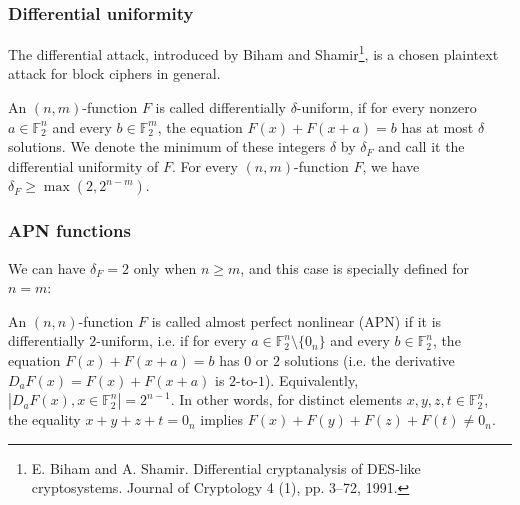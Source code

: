 \documentclass[
    aspectratio=169,                   %
]{beamer}
\newcommand{\Fn}{\mathbb{F}_2^n}
\newcommand{\Fm}{\mathbb{F}_2^m}
\newcommand{\df}{\delta_F}
\begin{document}
    \begin{frame}
        \frametitle{Differential uniformity}
        The differential attack, introduced by Biham and Shamir\footnote{E. Biham and A. Shamir. Differential cryptanalysis of DES-like cryptosystems. Journal of
        Cryptology 4 (1), pp. 3–72, 1991.}, is a chosen plaintext attack for block ciphers in general.

        An $(n,m)$-function $F$ is called differentially $\delta$-uniform, if for every nonzero $a \in \Fn$ and every $b\in\Fm$, 
        the equation $F(x)+F(x+a)=b$ has at most $\delta$ solutions. We denote the minimum of these integers $ \delta $ by $ \delta_F $
        and call it the differential uniformity of $F$. For every $(n, m)$-function $F$, we have $\delta_F \geq \max(2, 2^{n−m})$.
    \end{frame}
    \begin{frame}
        \frametitle{APN functions}
        We can have $\delta_F = 2$ only when $n \geq m$, and this case is specially defined for $ n=m $:
        \begin{definition}
            An $(n, n)$-function $F$ is called almost perfect nonlinear (APN) if it is differentially $2$-uniform, i.e.
            if for every $a \in \Fn \setminus \{0_n\} $ and every $b \in \Fn$, the equation $F(x) + F(x + a) = b$ has $0$ or $2$ solutions 
            (i.e. the derivative $D_aF(x) = F(x) + F(x + a)$ is $2$-to-$1$). Equivalently, $|{D_aF(x), x \in \Fn}| =2^{n−1} $.
            In other words, for distinct elements $x, y, z, t\in\Fn$, the equality $ x + y + z + t = 0_n $ implies $F(x) + F(y) +F(z) + F(t) \neq 0_n$. 
        \end{definition}
    \end{frame}


\end{document}
